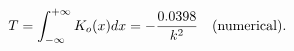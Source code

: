 \begin{equation}
T=\int_{-\infty}^{+\infty}K_o(x)dx=-\frac{0.0398}{k^2}\ \ \ {\rm
(numerical)}.
\end{equation}

